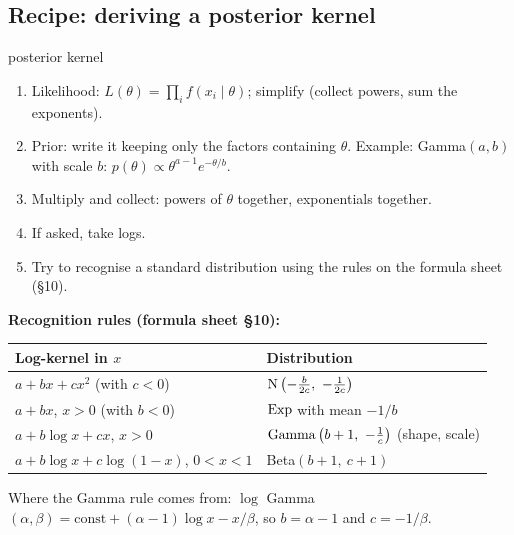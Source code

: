 \subsection{Recipe: deriving a posterior kernel}
\begin{algo}{posterior kernel}
\begin{enumerate}
  \item Likelihood: $L(\theta) = \prod_i f(x_i\mid\theta)$; simplify (collect powers, sum the exponents).
  \item Prior: write it keeping only the factors containing $\theta$. Example: Gamma$(a,b)$ with scale $b$: $p(\theta)\propto\theta^{a-1}e^{-\theta/b}$.
  \item Multiply and collect: powers of $\theta$ together, exponentials together.
  \item If asked, take logs.
  \item Try to recognise a standard distribution using the rules on the formula sheet (\S10).
\end{enumerate}
\end{algo}

\textbf{Recognition rules (formula sheet \S10):}
\begin{center}
\begin{tabular}{ll}
\toprule
Log-kernel in $x$ & Distribution \\
\midrule
$a + bx + cx^2$ (with $c<0$) & $\N\left(-\frac{b}{2c},\ -\frac{1}{2c}\right)$ \\
$a + bx$, $x>0$ (with $b<0$) & $\mathrm{Exp}$ with mean $-1/b$ \\
$a + b\log x + cx$, $x>0$ & $\Gam\left(b+1,\ -\frac1c\right)$ (shape, scale) \\
$a + b\log x + c\log(1-x)$, $0<x<1$ & Beta$(b+1,\ c+1)$ \\
\bottomrule
\end{tabular}
\end{center}
Where the Gamma rule comes from: $\log$ Gamma$(\alpha,\beta) = \text{const}+(\alpha-1)\log x - x/\beta$, so $b=\alpha-1$ and $c = -1/\beta$.

